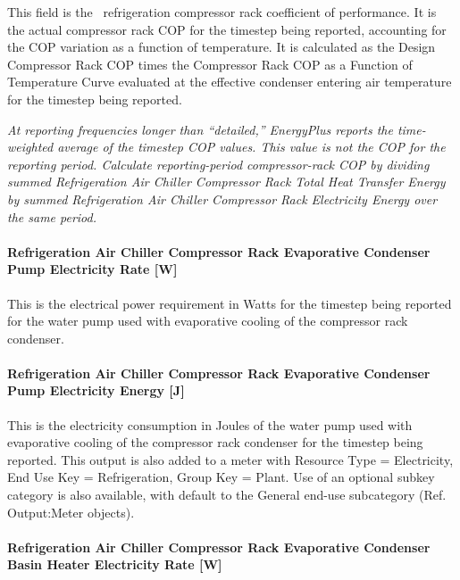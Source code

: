 This field is the~ refrigeration compressor rack coefficient of performance. It is the actual compressor rack COP for the timestep being reported, accounting for the COP variation as a function of temperature. It is calculated as the Design Compressor Rack COP times the Compressor Rack COP as a Function of Temperature Curve evaluated at the effective condenser entering air temperature for the timestep being reported.

\emph{At reporting frequencies longer than ``detailed,'' EnergyPlus reports the time-weighted average of the timestep COP values. This value is not the COP for the reporting period. Calculate reporting-period compressor-rack COP by dividing summed Refrigeration Air Chiller Compressor Rack Total Heat Transfer Energy by summed Refrigeration Air Chiller Compressor Rack Electricity Energy over the same period.}

\paragraph{Refrigeration Air Chiller Compressor Rack Evaporative Condenser Pump Electricity Rate {[}W{]}}\label{refrigeration-air-chiller-compressor-rack-evaporative-condenser-pump-electric-power-w}

This is the electrical power requirement in Watts for the timestep being reported for the water pump used with evaporative cooling of the compressor rack condenser.

\paragraph{Refrigeration Air Chiller Compressor Rack Evaporative Condenser Pump Electricity Energy {[}J{]}}\label{refrigeration-air-chiller-compressor-rack-evaporative-condenser-pump-electric-energy-j}

This is the electricity consumption in Joules of the water pump used with evaporative cooling of the compressor rack condenser for the timestep being reported. This output is also added to a meter with Resource Type = Electricity, End Use Key = Refrigeration, Group Key = Plant. Use of an optional subkey category is also available, with default to the General end-use subcategory (Ref. Output:Meter objects).

\paragraph{Refrigeration Air Chiller Compressor Rack Evaporative Condenser Basin Heater Electricity Rate {[}W{]}}\label{refrigeration-air-chiller-compressor-rack-evaporative-condenser-basin-heater-electric-power-w}

